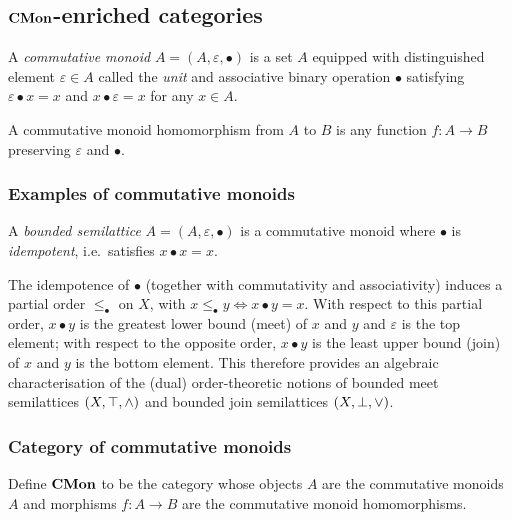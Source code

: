 \subsection{$\mathbf{CMon}$-enriched categories}
\label{sec:cmon-enriched}

\begin{definition}
A \emph{commutative monoid} $A = (A, \varepsilon, \bullet)$ is a set $A$ equipped with distinguished element
$\varepsilon \in A$ called the \emph{unit} and associative binary operation $\bullet$ satisfying $\varepsilon
\bullet x = x$ and $x \bullet \varepsilon = x$ for any $x \in A$.
\end{definition}

A commutative monoid homomorphism from $A$ to $B$ is any function $f: A \to B$ preserving $\varepsilon$ and
$\bullet$.

\subsubsection{Examples of commutative monoids}

\begin{definition}
A \emph{bounded semilattice} $A = (A, \varepsilon, \bullet)$ is a commutative monoid where $\bullet$ is
\emph{idempotent}, i.e.~satisfies $x \bullet x = x$.
\end{definition}

\noindent The idempotence of $\bullet$ (together with commutativity and associativity) induces a partial order
$\le_\bullet$ on $X$, with $x \le_{\bullet} y \iff x \bullet y = x$. With respect to this partial order, $x
\bullet y$ is the greatest lower bound (meet) of $x$ and $y$ and $\varepsilon$ is the top element; with
respect to the opposite order, $x \bullet y$ is the least upper bound (join) of $x$ and $y$ is the bottom
element. This therefore provides an algebraic characterisation of the (dual) order-theoretic notions of
bounded meet semilattices $(X, \top, \wedge)$ and bounded join semilattices $(X, \bot, \vee)$.

\subsubsection{Category of commutative monoids}

\begin{definition}
Define $\mathbf{CMon}$ to be the category whose objects $A$ are the commutative monoids $A$ and morphisms $f: A \to B$
are the commutative monoid homomorphisms.
\end{definition}

